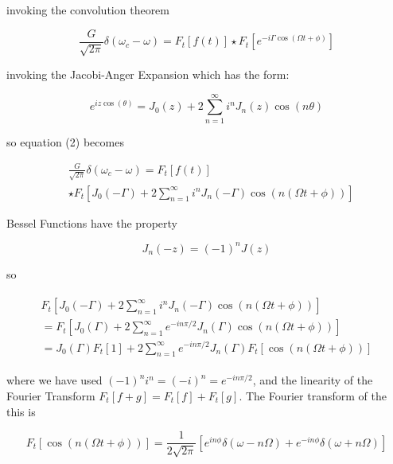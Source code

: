 \documentclass[twocolumn, groupedaddress]{revtex4-1}
\begin{document}
invoking the convolution theorem

\begin{equation}
\frac{G}{\sqrt{2\pi}} \delta (\omega_c - \omega) = F_t \left[ f(t) \right] \star F_t \left[ e^{-i\Gamma \cos (\Omega t + \phi)} \right]
\end{equation}

invoking the Jacobi-Anger Expansion which has the form:

\begin{equation}
e^{iz\cos (\theta)} = J_0(z) + 2 \sum_{n=1}^{\infty} i^n J_n(z) \cos (n\theta)
\end{equation}

so equation (2) becomes

\begin{align}
&\frac{G}{\sqrt{2\pi}} \delta (\omega_c - \omega) = \nonumber
F_t \left[ f(t) \right] \\
&\star F_t \left[ J_0(-\Gamma) + 2 \sum_{n=1}^{\infty} i^n J_n(-\Gamma) \cos (n(\Omega t + \phi)) \right]
\end{align}

Bessel Functions have the property 

\begin{equation}
J_n(-z) = (-1)^n J(z)
\end{equation}

so 

\begin{align}
\begin{aligned}
F_t \left[ J_0(-\Gamma) + 2 \sum_{n=1}^{\infty} i^n J_n(-\Gamma) \cos (n(\Omega t + \phi)) \right] \\
= F_t \left[ J_0(\Gamma) + 2 \sum_{n=1}^{\infty} e^{-in\pi/2} J_n(\Gamma) \cos (n(\Omega t + \phi)) \right] \\
= J_0(\Gamma) F_t \left[ 1 \right] + 2 \sum_{n=1}^{\infty} e^{-in\pi/2} J_n(\Gamma) F_t \left[ \cos (n(\Omega t + \phi)) \right]
\end{aligned}
\end{align}

where we have used $(-1)^n i^n = (-i)^n = e^{-in\pi/2}$, and the linearity of the Fourier Transform $F_t[f+g]=F_t[f]+F_t[g]$.  The Fourier transform of the this is 

\begin{equation}
F_t \left[ \cos (n(\Omega t + \phi)) \right] = 
	\frac{1}{2\sqrt{2\pi}} \left[ e^{in\phi} \delta (\omega - n\Omega) + e^{-in\phi} \delta (\omega + n\Omega) \right]
\end{equation}
\end{document}
